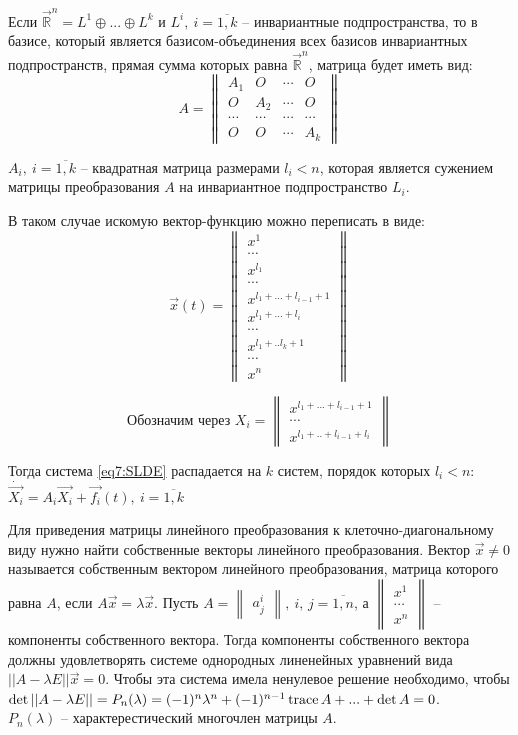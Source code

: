Если $\vec{\mathbb{R}}^n = L^1 \oplus ... \oplus L^k$ и $L^i, ~i = \overline{1, k}$ -- инвариантные подпространства, то в базисе, который является базисом-объединения всех базисов инвариантных подпространств, прямая сумма которых равна $\vec{\mathbb{R}}^n$, матрица будет иметь вид:
\[A = \begin{Vmatrix} A_1 & O & \cdots & O \\ O & A_2 & \cdots & O \\ \cdots & \cdots & \cdots & \cdots \\ O & O &\cdots & A_k \end{Vmatrix} \] 

$A_i, ~i = \overline{1, k}$ -- квадратная матрица размерами $l_i < n$, которая является сужением матрицы преобразования $A$ на инвариантное подпространство $L_i$.

В таком случае искомую вектор-функцию можно переписать в виде: 
\[ \vec{x}(t) = \begin{Vmatrix} x^1 \\ \cdots \\ x^{l_1} \\ \cdots \\ x^{l_1 + ... + l_{i-1} + 1} \\ x^{l_1 + ... + l_{i}} \\ \cdots \\ x^{l_1 + .. l_k + 1} \\ \cdots \\ x^n \end{Vmatrix}\]

\[\text{Обозначим через } X_i = \begin{Vmatrix} x^{l_1 + ... + l_{i-1} + 1} \\ \cdots \\ x^{l_1 + .. + l_{i-1} + l_{i}}\end{Vmatrix} \]

Тогда система \eqref{eq7:SLDE} распадается на $k$ систем, порядок которых $l_i < n$: \\
$\dot{\vec{X_i}} = A_i \vec{X_i} + \vec{f_i}(t), ~i =\overline{1, k}$

Для приведения матрицы линейного преобразования к клеточно-диагональному виду нужно найти собственные векторы линейного преобразования. 
Вектор $\vec{x} \neq 0$ называется собственным вектором линейного преобразования, матрица которого равна $A$, если $A\vec{x} = \lambda \vec{x}$. 
Пусть $A = \begin{Vmatrix} a_j^i \end{Vmatrix}, ~i,\,j = \overline{1, n}$, а $\begin{Vmatrix} x^1 \\ \cdots \\ x^n \end{Vmatrix}$ -- компоненты собственного вектора.
Тогда компоненты собственного вектора должны удовлетворять системе однородных линенейных уравнений вида $|| A - \lambda E|| \vec{x} = 0$. 
Чтобы эта система имела ненулевое решение необходимо, чтобы $\det || A - \lambda E|| = P_n(\lambda) = (-1)^n \lambda^n + (-1)^{n-1} \operatorname{trace} A + ... + \det A = 0$. \\
$P_n(\lambda)$ -- характерестический многочлен матрицы $A$. 

